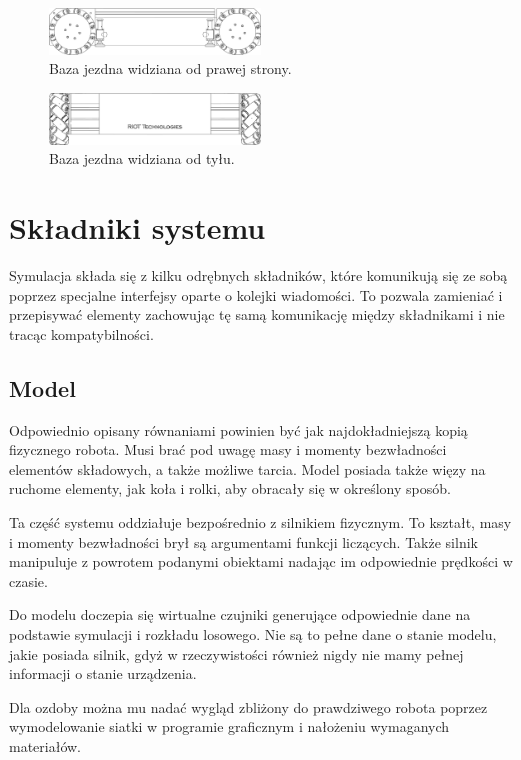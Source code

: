 \begin{figure}
\centering
 \includegraphics[width=0.5\textwidth]{graphics/base_side.pdf}
\caption{Baza jezdna widziana od prawej strony.}
\end{figure} 

\begin{figure}
\centering
 \includegraphics[width=0.5\textwidth]{graphics/base_front.pdf}
\caption{Baza jezdna widziana od tyłu.}
\end{figure} 

\section{Składniki systemu}
Symulacja składa się z kilku odrębnych składników, które komunikują się ze sobą poprzez specjalne interfejsy oparte o kolejki wiadomości.
To pozwala zamieniać i przepisywać elementy zachowując tę samą komunikację między składnikami i nie tracąc kompatybilności.

\subsection{Model}
 Odpowiednio opisany równaniami powinien być jak najdokładniejszą kopią fizycznego robota.
 Musi brać pod uwagę masy i momenty bezwładności elementów składowych, a także możliwe tarcia.
 Model posiada także więzy na ruchome elementy, jak koła i rolki, aby obracały się w określony sposób.
 
 Ta część systemu oddziałuje bezpośrednio z silnikiem fizycznym. 
 To kształt, masy i momenty bezwładności brył są argumentami funkcji liczących.
 Także silnik manipuluje z powrotem podanymi obiektami nadając im odpowiednie prędkości w czasie.
 
 Do modelu doczepia się wirtualne czujniki generujące odpowiednie dane na podstawie symulacji i rozkładu losowego.
 Nie są to pełne dane o stanie modelu, jakie posiada silnik, gdyż w rzeczywistości również nigdy nie mamy pełnej informacji o stanie urządzenia.
 
 Dla ozdoby można mu nadać wygląd zbliżony do prawdziwego robota poprzez wymodelowanie siatki w programie graficznym i nałożeniu wymaganych materiałów.

